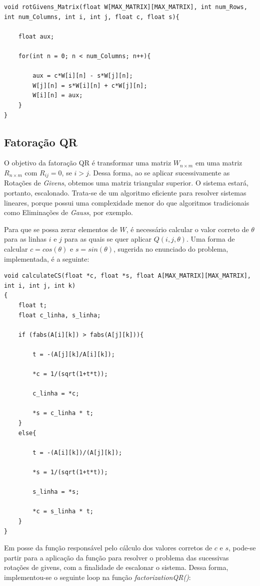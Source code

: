 \documentclass[twocolumn,amsmath,amssymb,floatfix]{revtex4}
\begin{document}
\begin{lstlisting}
void rotGivens_Matrix(float W[MAX_MATRIX][MAX_MATRIX], int num_Rows, int num_Columns, int i, int j, float c, float s){

	float aux;

	for(int n = 0; n < num_Columns; n++){

		aux = c*W[i][n] - s*W[j][n];
		W[j][n] = s*W[i][n] + c*W[j][n];
		W[i][n] = aux;
	}
}
\end{lstlisting}

\subsection{Fatoração QR}

O objetivo da fatoração QR é transformar uma matriz $W_{n \times m}$ em uma matriz $R_{n \times m}$ com $R_{ij} = 0$, se $i > j$. Dessa forma, ao se aplicar sucessivamente as Rotações de \textit{Givens}, obtemos uma matriz triangular superior. O sistema estará, portanto, escalonado. Trata-se de um algoritmo eficiente para resolver sistemas lineares, porque possui uma complexidade menor do que algoritmos tradicionais como Eliminações de \textit{Gauss}, por exemplo. 

Para que se possa zerar elementos de $W$, é necessário calcular o valor correto de $\theta$ para as linhas $i$ e $j$ para as quais se quer aplicar $Q(i, j, \theta)$. Uma forma de calcular $c = cos(\theta)$ e $s = sin(\theta)$, sugerida no enunciado do problema, implementada, é a seguinte: 

\begin{lstlisting}
void calculateCS(float *c, float *s, float A[MAX_MATRIX][MAX_MATRIX], int i, int j, int k)
{
	float t;
	float c_linha, s_linha;

	if (fabs(A[i][k]) > fabs(A[j][k])){

		t = -(A[j][k]/A[i][k]);

		*c = 1/(sqrt(1+t*t));

		c_linha = *c;

		*s = c_linha * t;
	}
	else{

		t = -(A[i][k])/(A[j][k]);

		*s = 1/(sqrt(1+t*t));

		s_linha = *s;

		*c = s_linha * t;
	}
}
\end{lstlisting}

Em posse da função responsável pelo cálculo dos valores corretos de $c$ e $s$, pode-se partir para a aplicação da função para resolver o problema das sucessivas rotações de givens, com a finalidade de escalonar o sistema. Dessa forma, implementou-se o seguinte loop na função \textit{factorizationQR()}:
\end{document}
